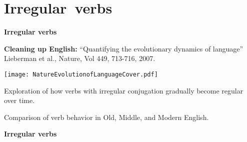 

















\section{Irregular\ verbs}

  \textbf{Irregular verbs}

  \textbf{Cleaning up English:}
    \alert{``Quantifying the evolutionary dynamics of language''}\cite{lieberman2007a}\\
    Lieberman et al., Nature, Vol 449, 713-716, 2007.
  

      
    \texttt{[image: NatureEvolutionofLanguageCover.pdf]}
    
    
      
       
        Exploration of how verbs with irregular 
        conjugation gradually become regular over time.
       
        Comparison of verb behavior in Old, Middle, and Modern English.
      
    
  

  \textbf{Irregular verbs}


